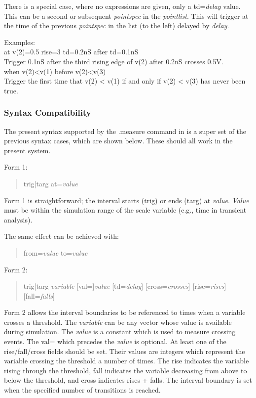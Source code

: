 There is a special case, where no expressions are given, only a {\vt
td=}{\it delay} value.  This can be a second or subsequent {\it
pointspec} in the {\it pointlist}.  This will trigger at the time of
the previous {\it pointspec} in the list (to the left) delayed by {\it
delay}.

Examples:\\
{\vt at v(2)=0.5 rise=3 td=0.2nS after td=0.1nS}\\
\hspace*{1em}Trigger 0.1nS after the third rising edge of v(2) after
0.2nS crosses 0.5V.\\
{\vt when v(2)<v(1) before v(2)<v(3)}\\
\hspace*{1em}Trigger the first time that {\vt v(2) < v(1)} if and only
if {\vt v(2) < v(3)} has never been true.

\subsubsection{Syntax Compatibility}

The present syntax supported by the {\vt .measure} command in
{\WRspice} is a super set of the previous syntax cases, which
    are shown below.  These should all work in the present system.

Form 1:
\begin{quote}\vt
    trig|targ at={\it value}
\end{quote}

Form 1 is straightforward; the interval starts ({\vt trig}) or ends
({\vt targ}) at {\it value}.  {\it Value} must be within the
simulation range of the scale variable (e.g., time in transient
analysis).

The same effect can be achieved with:
\begin{quote}\vt
    from={\it value} to={\it value}
\end{quote}

Form 2:
\begin{quote}\vt
    trig|targ {\it variable} [val=]{\it value}
        [td={\it delay}] [cross={\it crosses}]
        [rise={\it rises}] [fall={\it falls}]
\end{quote}

Form 2 allows the interval boundaries to be referenced to times when a
variable crosses a threshold.  The {\it variable} can be any vector
whose value is available during simulation.  The {\it value} is a
constant which is used to measure crossing events.  The {\vt val=}
which precedes the {\it value} is optional.  At least one of the {\vt
rise/fall/cross} fields should be set.  Their values are integers
which represent the variable crossing the threshold a number of times. 
The {\vt rise} indicates the variable rising through the threshold,
{\vt fall} indicates the variable decreasing from above to below the
threshold, and {\vt cross} indicates {\vt rises + falls}.  The
interval boundary is set when the specified number of transitions is
reached.

